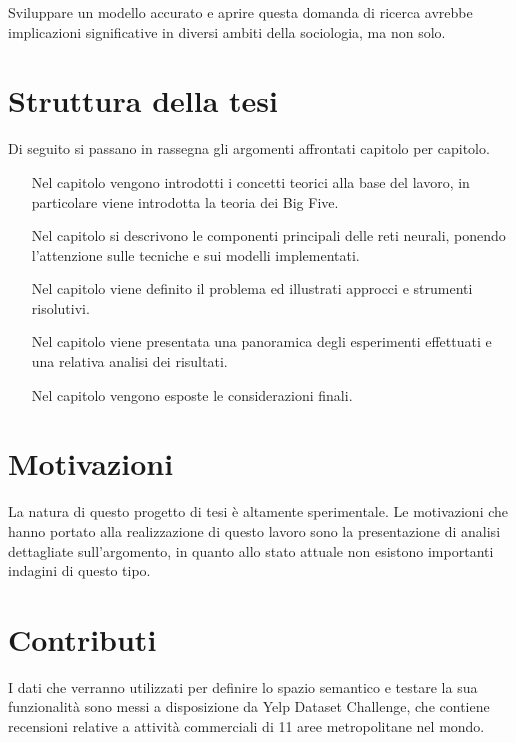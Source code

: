 Sviluppare un modello accurato e aprire questa domanda di ricerca avrebbe implicazioni significative in diversi ambiti della sociologia, ma non solo.

\section*{Struttura della tesi}
Di seguito si passano in rassegna gli argomenti affrontati capitolo per capitolo.

\begin{itemize}
	\item [Nel capitolo \setfont{\nameref{chap:contesto}}] vengono introdotti i concetti teorici alla base del lavoro, in particolare viene introdotta la teoria dei Big Five. 
	\item [Nel capitolo \setfont{ \nameref{chap:RetiNeurali}}] si descrivono le componenti principali delle reti neurali, ponendo l'attenzione sulle tecniche e sui modelli implementati. 
	\item [Nel capitolo \setfont{\nameref{chap:formulazione}}] viene definito il problema ed illustrati approcci e strumenti risolutivi.
	\item [Nel capitolo \setfont{\nameref{chap:esperimenti}}] viene presentata una panoramica degli esperimenti effettuati e una relativa analisi dei risultati.
	\item [Nel capitolo \setfont{\nameref{chap:conclusioni}}] vengono esposte le considerazioni finali.
\end{itemize}

\section*{Motivazioni}
\label{sec:motivazione}

La natura di questo progetto di tesi è altamente sperimentale. Le motivazioni che hanno portato alla realizzazione di questo lavoro sono la presentazione di analisi dettagliate sull'argomento, in quanto allo stato attuale non esistono importanti indagini di questo tipo.

\section*{Contributi}
\label{sec:contributi}

I dati che verranno utilizzati per definire lo spazio semantico e testare la sua funzionalità sono messi a disposizione da Yelp Dataset Challenge, che contiene  recensioni relative a  attività commerciali di 11 aree metropolitane nel mondo. 
